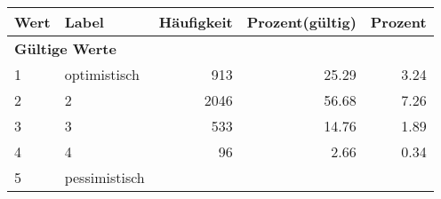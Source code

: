      \begin{longtable}{lXrrr}
     \toprule
     \textbf{Wert} & \textbf{Label} & \textbf{Häufigkeit} & \textbf{Prozent(gültig)} & \textbf{Prozent} \\
     \endhead
     \midrule
     \multicolumn{5}{l}{\textbf{Gültige Werte}}\\

     1 &
     \multicolumn{1}{X}{ optimistisch   } &


       \num{913} &
       \num[round-mode=places,round-precision=2]{25,29} &
         \num[round-mode=places,round-precision=2]{3,24} \\

     2 &
     \multicolumn{1}{X}{ 2   } &


       \num{2046} &
       \num[round-mode=places,round-precision=2]{56,68} &
         \num[round-mode=places,round-precision=2]{7,26} \\

     3 &
     \multicolumn{1}{X}{ 3   } &


       \num{533} &
       \num[round-mode=places,round-precision=2]{14,76} &
         \num[round-mode=places,round-precision=2]{1,89} \\

     4 &
     \multicolumn{1}{X}{ 4   } &


       \num{96} &
       \num[round-mode=places,round-precision=2]{2,66} &
         \num[round-mode=places,round-precision=2]{0,34} \\

     5 &
     \multicolumn{1}{X}{ pessimistisch   } &



\end{longtable}
